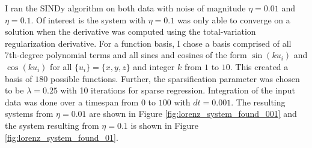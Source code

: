 \documentclass[10pt]{paper}
\begin{document}
I ran the SINDy algorithm on both data with noise of magnitude $\eta = 0.01$ and $\eta = 0.1$. Of interest is the system with $\eta = 0.1$ was only able to converge on a solution when the derivative was computed using the total-variation regularization derivative. 
For a function basis, I chose a basis comprised of all 7th-degree polynomial terms and all sines and cosines of the form $\sin{(ku_i)}$ and $\cos{(ku_i)}$ for all $\{u_i\} = \{x,y,z\}$ and integer $k$ from $1$ to $10$. This created a basis of $180$ possible functions. 
Further, the sparsification parameter was chosen to be $\lambda = 0.25$ with 10 iterations for sparse regression.
Integration of the input data was done over a timespan from $0$ to $100$ with $dt = 0.001$. 
The resulting systems from $\eta = 0.01$ are shown in Figure \ref{fig:lorenz_system_found_001} and the system resulting from $\eta = 0.1$ is shown in Figure \ref{fig:lorenz_system_found_01}. 
\end{document}
